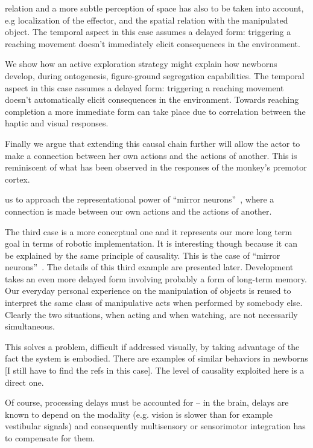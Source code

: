 \ifverbose
relation and a
more subtle perception of space has also to be taken into account, e.g
localization of the effector, and the spatial relation with the
manipulated object.  The temporal aspect in this case assumes a
delayed form: triggering a reaching movement doesn't immediately
elicit consequences in the environment.

We
show how an active exploration strategy might explain how newborns
develop, during ontogenesis, figure-ground segregation capabilities.
The temporal aspect in this case assumes a delayed form: triggering a
reaching movement doesn't automatically elicit consequences in the
environment. Towards reaching completion a more immediate form can
take place due to correlation between the haptic and visual responses.
\fi


Finally we argue that extending this causal chain further will allow
the actor to make a connection between her own actions and the actions 
of another. This is reminiscent of what has been observed in the responses
of the monkey's premotor cortex. 

\ifverbose
us to approach the representational power of ``mirror
neurons''~\cite{fadiga00visuomotor}, where a connection is made
between our own actions and the actions of another.
\fi

\ifverbose
The third case is a more conceptual one and it represents our more long
term goal in terms of robotic implementation. It is interesting though
because it can be explained by the same principle of causality. This
is the case of ``mirror neurons''~\cite{fadiga00visuomotor}. The
details of this third example are presented later.  Development takes
an even more delayed form involving probably a form of long-term
memory. Our everyday personal experience on the manipulation of objects is
reused to interpret the same class of manipulative acts when performed
by somebody else.  Clearly the two situations, when acting and when watching,
 are not necessarily simultaneous.
\fi

\ifverbose
This solves a problem,
difficult if addressed visually, by taking advantage of the fact the
system is embodied.  There are examples of similar behaviors in
newborns [I still have to find the refs in this case]. The level of
causality exploited here is a direct one. 
\fi

\ifverbose
  Of
course, processing delays must be accounted for -- in the brain,
delays are known to depend on the modality (e.g. vision is slower than
for example vestibular signals) and consequently multisensory or
sensorimotor integration has to compensate for them.
\fi



